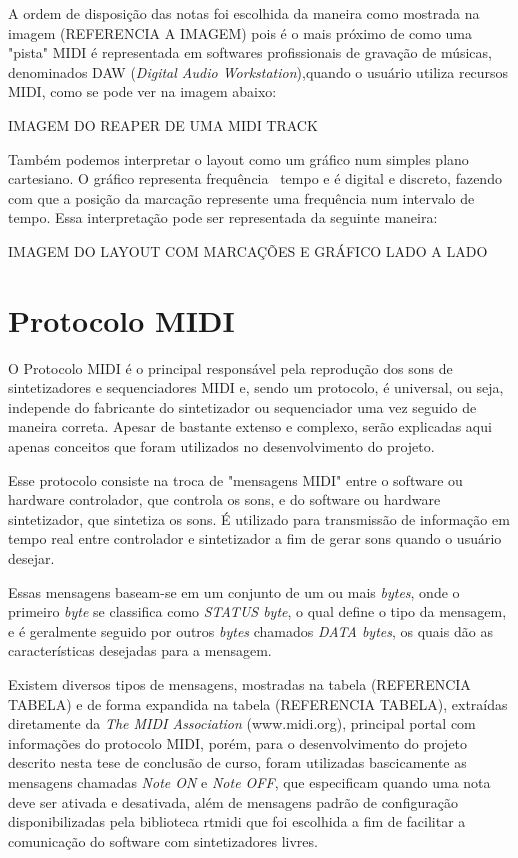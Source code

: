\documentclass[12pt]{report}
\begin{document}
A ordem de disposição das notas foi escolhida da maneira como mostrada na imagem (REFERENCIA A IMAGEM) pois é o mais próximo de como uma "pista" MIDI é representada em softwares profissionais de gravação de músicas, denominados DAW ({\it Digital Audio Workstation}),quando o usuário utiliza recursos MIDI, como se pode ver na imagem abaixo:

IMAGEM DO REAPER DE UMA MIDI TRACK

Também podemos interpretar o layout como um gráfico num simples plano cartesiano. O gráfico representa frequência \times\ tempo e é digital e discreto, fazendo com que a posição da marcação represente uma frequência num intervalo de tempo. Essa interpretação pode ser representada da seguinte maneira:

IMAGEM DO LAYOUT COM MARCAÇÕES E GRÁFICO LADO A LADO

\chapter{Protocolo MIDI}
\label{cha:fund-teor}

O Protocolo MIDI é o principal responsável pela reprodução dos sons de sintetizadores e sequenciadores MIDI e, sendo um protocolo, é universal, ou seja, independe do fabricante do sintetizador ou sequenciador uma vez seguido de maneira correta. Apesar de bastante extenso e complexo, serão explicadas aqui apenas conceitos que foram utilizados no desenvolvimento do projeto.

Esse protocolo consiste na troca de "mensagens MIDI" entre o software ou hardware controlador, que controla os sons, e do software ou hardware sintetizador, que sintetiza os sons. É utilizado para transmissão de informação em tempo real entre controlador e sintetizador a fim de gerar sons quando o usuário desejar.

Essas mensagens baseam-se em um conjunto de um ou mais {\it bytes}, onde o primeiro {\it byte} se classifica como {\it STATUS byte}, o qual define o tipo da mensagem, e é geralmente seguido por outros {\it bytes} chamados {\it DATA bytes}, os quais dão as características desejadas para a mensagem.

Existem diversos tipos de mensagens, mostradas na tabela (REFERENCIA TABELA) e de forma expandida na tabela (REFERENCIA TABELA), extraídas diretamente da {\it The MIDI Association} (www.midi.org), principal portal com informações do protocolo MIDI, porém, para o desenvolvimento do projeto descrito nesta tese de conclusão de curso, foram utilizadas bascicamente as mensagens chamadas {\it Note ON} e {\it Note OFF}, que especificam quando uma nota deve ser ativada e desativada, além de mensagens padrão de configuração disponibilizadas pela biblioteca rtmidi que foi escolhida a fim de facilitar a comunicação do software com sintetizadores livres.
\end{document}

